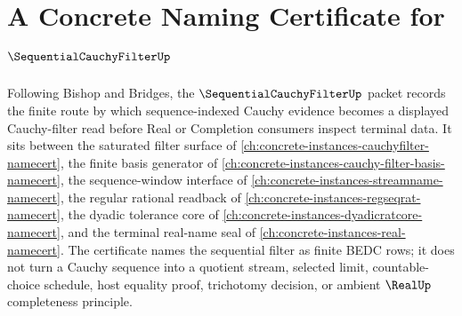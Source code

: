\chapter{A Concrete Naming Certificate for $\SequentialCauchyFilterUp$}
\label{ch:concrete-instances-sequential-cauchy-filter-namecert}

Following Bishop and Bridges, the $\SequentialCauchyFilterUp$ packet records the finite route by which sequence-indexed Cauchy evidence becomes a displayed Cauchy-filter read before Real or Completion consumers inspect terminal data. It sits between the saturated filter surface of \autoref{ch:concrete-instances-cauchyfilter-namecert}, the finite basis generator of \autoref{ch:concrete-instances-cauchy-filter-basis-namecert}, the sequence-window interface of \autoref{ch:concrete-instances-streamname-namecert}, the regular rational readback of \autoref{ch:concrete-instances-regseqrat-namecert}, the dyadic tolerance core of \autoref{ch:concrete-instances-dyadicratcore-namecert}, and the terminal real-name seal of \autoref{ch:concrete-instances-real-namecert}. The certificate names the sequential filter as finite BEDC rows; it does not turn a Cauchy sequence into a quotient stream, selected limit, countable-choice schedule, host equality proof, trichotomy decision, or ambient $\RealUp$ completeness principle.

